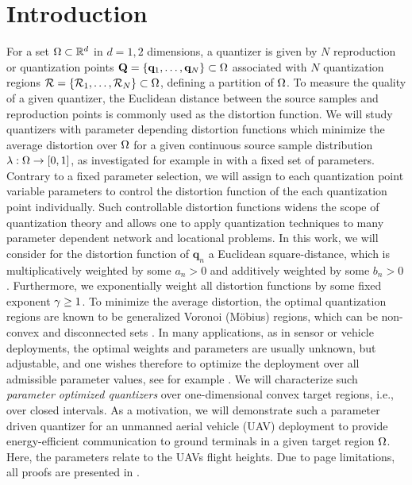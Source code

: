 \documentclass[12pt,onecolumn,journal,draftclsnofoot,letterpaper]{IEEEtran}
\newif\ifarxiv\arxivfalse
\newcounter{example}[section]
\renewcommand{\vp}{\mathbf q}
\renewcommand{\vP}{\mathbf Q}
\newcommand{\Rset}{\ensuremath{\mathcal R}}
\begin{document}
\section{Introduction}

%
For a set $\Omega\subset{\ensuremath{\mathbb R}}^d$ in $d=1,2$ dimensions, a quantizer is given by $N$ reproduction or quantization points
$\vP=\{\vp_1,\dots,\vp_N\}\subset \Ome$ associated with $N$ quantization regions
$\Rset=\{\Rset_1,\dots,\Rset_N\}\subset\Ome$, defining a partition of $\Omega$.
%
To measure the quality of a given quantizer, the Euclidean distance between the source samples and reproduction points
is commonly used as the distortion function. We will study quantizers with parameter depending distortion functions
which minimize the average distortion over $\Omega$ for a given continuous source sample distribution $\lambda:\Omega\to
[0,1]$, as investigated for example in \cite{Erdem16,KJ17,KKSS18} with a fixed set of parameters.
%
Contrary to a fixed parameter selection, we will assign to each quantization point variable parameters to control the
distortion function of the each quantization point individually.  Such controllable distortion functions widens the
scope of quantization theory and allows one to apply quantization techniques to many parameter dependent network and
locational problems.
%
In this work, we will consider for the distortion function of $\vp_n$ a Euclidean square-distance, which is
multiplicatively weighted by some $a_n>0$ and additively weighted by some $b_n>0$. Furthermore, we exponentially weight
all distortion functions by some fixed exponent $\gamma\geq 1$. To minimize the average distortion, the optimal
quantization regions are known to be generalized Voronoi (Möbius) regions, which can be non-convex and disconnected sets
\cite{BWY07}.
%
In many applications, as in sensor or vehicle deployments, the optimal weights and parameters are usually unknown, but
adjustable, and one wishes therefore to optimize the deployment over all admissible parameter values, see for example
\cite{KKSS18}.
%
We will characterize such \emph{parameter optimized quantizers}  over one-dimensional convex target regions, i.e., over
closed intervals. As a motivation, we will demonstrate such a parameter driven quantizer for an unmanned aerial vehicle
(UAV) deployment to provide energy-efficient communication to ground terminals in a given target region $\Omega$.  Here, the
parameters relate to the UAVs flight heights.  \ifarxiv \else Due to page limitations, all proofs are presented in
\cite{GWJ18b}.  \fi
\end{document}
